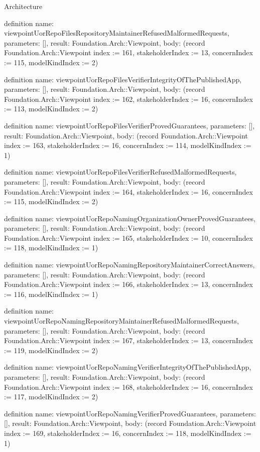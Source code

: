 \begin{lexlean}{Architecture}
\begin{semanticmodule}
definition{
  name: viewpointUorRepoFilesRepositoryMaintainerRefusedMalformedRequests,
  parameters: [],
  result: Foundation.Arch::Viewpoint,
  body: (record Foundation.Arch::Viewpoint {index := 161, stakeholderIndex := 13, concernIndex := 115, modelKindIndex := 2})
}

definition{
  name: viewpointUorRepoFilesVerifierIntegrityOfThePublishedApp,
  parameters: [],
  result: Foundation.Arch::Viewpoint,
  body: (record Foundation.Arch::Viewpoint {index := 162, stakeholderIndex := 16, concernIndex := 113, modelKindIndex := 2})
}

definition{
  name: viewpointUorRepoFilesVerifierProvedGuarantees,
  parameters: [],
  result: Foundation.Arch::Viewpoint,
  body: (record Foundation.Arch::Viewpoint {index := 163, stakeholderIndex := 16, concernIndex := 114, modelKindIndex := 1})
}

definition{
  name: viewpointUorRepoFilesVerifierRefusedMalformedRequests,
  parameters: [],
  result: Foundation.Arch::Viewpoint,
  body: (record Foundation.Arch::Viewpoint {index := 164, stakeholderIndex := 16, concernIndex := 115, modelKindIndex := 2})
}

definition{
  name: viewpointUorRepoNamingOrganizationOwnerProvedGuarantees,
  parameters: [],
  result: Foundation.Arch::Viewpoint,
  body: (record Foundation.Arch::Viewpoint {index := 165, stakeholderIndex := 10, concernIndex := 118, modelKindIndex := 1})
}

definition{
  name: viewpointUorRepoNamingRepositoryMaintainerCorrectAnswers,
  parameters: [],
  result: Foundation.Arch::Viewpoint,
  body: (record Foundation.Arch::Viewpoint {index := 166, stakeholderIndex := 13, concernIndex := 116, modelKindIndex := 1})
}

definition{
  name: viewpointUorRepoNamingRepositoryMaintainerRefusedMalformedRequests,
  parameters: [],
  result: Foundation.Arch::Viewpoint,
  body: (record Foundation.Arch::Viewpoint {index := 167, stakeholderIndex := 13, concernIndex := 119, modelKindIndex := 2})
}

definition{
  name: viewpointUorRepoNamingVerifierIntegrityOfThePublishedApp,
  parameters: [],
  result: Foundation.Arch::Viewpoint,
  body: (record Foundation.Arch::Viewpoint {index := 168, stakeholderIndex := 16, concernIndex := 117, modelKindIndex := 2})
}

definition{
  name: viewpointUorRepoNamingVerifierProvedGuarantees,
  parameters: [],
  result: Foundation.Arch::Viewpoint,
  body: (record Foundation.Arch::Viewpoint {index := 169, stakeholderIndex := 16, concernIndex := 118, modelKindIndex := 1})
}


\end{semanticmodule}
\end{lexlean}
